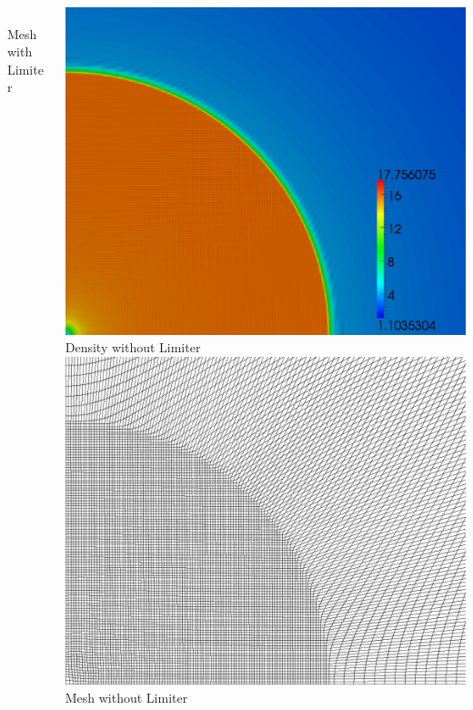 \documentclass[8pt,xcolor=svgnames]{beamer}
\begin{document}
\begin{frame}
\begin{columns}
\begin{column}{0.35\textwidth}
\begin{center}
\\Mesh with Limiter
\end{center}
\end{column}
\begin{column}{0.35\textwidth}
\begin{center}
\includegraphics[height=0.9\textwidth]{figs/Noh/Q2nl-7-density.png}
\\Density without Limiter
\includegraphics[height=0.9\textwidth]{figs/Noh/Q2nl-7-mesh.png}
\\Mesh without Limiter
\end{center}
\end{column}
\end{columns}
\end{frame}
\end{document}
